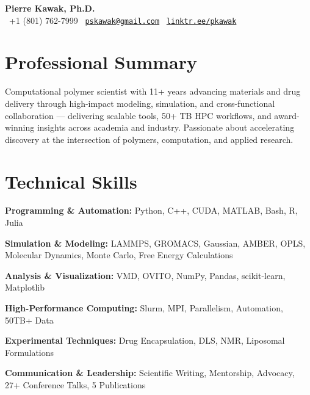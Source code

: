 \documentclass[letterpaper,12pt]{article}
\begin{document}
\begin{center}
  {\LARGE \textbf{Pierre Kawak, Ph.D.}}\\[1ex]
  \faPhone\ +1 (801) 762-7999 \quad \faEnvelope\ \href{mailto:pskawak@gmail.com}{\tt pskawak@gmail.com} \quad \faLink\ \href{https://linktr.ee/pkawak}{\tt linktr.ee/pkawak}
\end{center}

\vspace{-0.3\baselineskip}
\section*{Professional Summary}
Computational polymer scientist with 11+ years advancing materials and drug delivery through high-impact modeling, simulation, and cross-functional collaboration — delivering scalable tools, 50+ TB HPC workflows, and award-winning insights across academia and industry. Passionate about accelerating discovery at the intersection of polymers, computation, and applied research.

\vspace{-0.3\baselineskip}
\section*{Technical Skills}
\begin{tabitemize}[leftmargin=*]
  \item \textbf{Programming \& Automation:} Python, C++, CUDA, MATLAB, Bash, R, Julia
  \item \textbf{Simulation \& Modeling:} LAMMPS, GROMACS, Gaussian, AMBER, OPLS, Molecular Dynamics, Monte Carlo, Free Energy Calculations
  \item \textbf{Analysis \& Visualization:} VMD, OVITO, NumPy, Pandas, scikit-learn, Matplotlib
  \item \textbf{High-Performance Computing:} Slurm, MPI, Parallelism, Automation, 50TB+ Data
  \item \textbf{Experimental Techniques:} Drug Encapsulation, DLS, NMR, Liposomal Formulations
  \item \textbf{Communication \& Leadership:} Scientific Writing, Mentorship, Advocacy, 27+ Conference Talks, 5 Publications
\end{tabitemize}

\vspace{-0.3\baselineskip}
\end{document}
